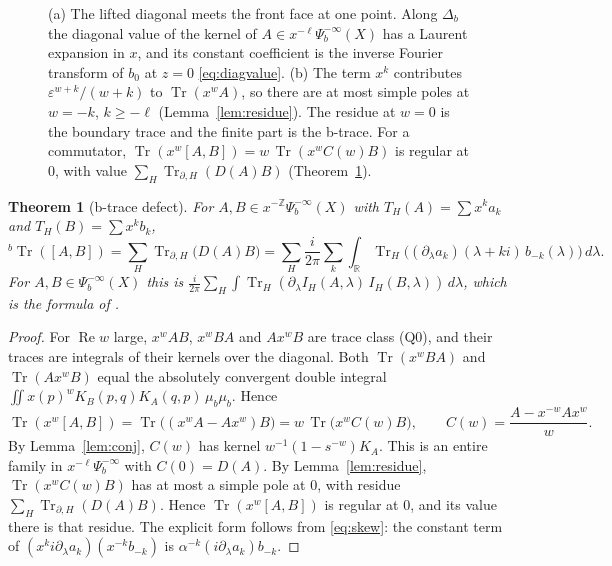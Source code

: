 \documentclass[11pt,oneside,reqno]{article}
\newcommand{\Z}{\mathbb Z}
\DeclareMathOperator{\Tr}{Tr}
\theoremstyle{plain}
\newtheorem{theorem}{Theorem}[section]
\theoremstyle{definition}
\theoremstyle{remark}
\begin{document}
\begin{figure}[tbp]
\caption[The diagonal residue and the b-trace]{(a) The lifted diagonal
meets the front face at one point. Along \(\Delta_b\) the diagonal value
of the kernel of \(A\in x^{-\ell}\Psi_b^{-\infty}(X)\) has a Laurent
expansion in \(x\), and its constant coefficient is the inverse Fourier
transform of \(b_0\) at \(z=0\) \eqref{eq:diagvalue}. (b) The term \(x^k\)
contributes \(\varepsilon^{w+k}/(w+k)\) to \(\Tr(x^wA)\), so there are at
most simple poles at \(w=-k\), \(k\geq-\ell\) (Lemma~\ref{lem:residue}).
The residue at \(w=0\) is the boundary trace and the finite part is the
b-trace. For a commutator, \(\Tr(x^w[A,B])=w\,\Tr(x^wC(w)B)\) is regular
at \(0\), with value \(\sum_H\Tr_{\partial,H}(D(A)B)\)
(Theorem~\ref{thm:defect}).}
\label{fig:btrace}
\end{figure}

\begin{theorem}[b-trace defect]\label{thm:defect}
For \(A,B\in x^{-\Z}\Psi_b^{-\infty}(X)\) with \(T_H(A)=\sum x^ka_k\) and
\(T_H(B)=\sum x^kb_k\),
\[
 {}^b\Tr([A,B])=\sum_H\Tr_{\partial,H}\bigl(D(A)B\bigr)
 =\sum_H\frac{i}{2\pi}\sum_k\int_{\mathbb R}
 \Tr_H\bigl((\partial_\lambda a_k)(\lambda+ki)\,b_{-k}(\lambda)\bigr)\,
 d\lambda .
\]
For \(A,B\in\Psi_b^{-\infty}(X)\) this is
\(\frac{i}{2\pi}\sum_H\int\Tr_H(\partial_\lambda I_H(A,\lambda)\,
I_H(B,\lambda))\,d\lambda\), which is the formula of
\cite[Thm.~``b-trace defect formula'']{Notes}.
\end{theorem}

\begin{proof}
For \(\operatorname{Re}w\) large, \(x^wAB\), \(x^wBA\) and \(Ax^wB\) are
trace class (Q0), and their traces are integrals of their kernels over the
diagonal. Both \(\Tr(x^wBA)\) and \(\Tr(Ax^wB)\) equal the absolutely
convergent double integral \(\iint x(p)^wK_B(p,q)K_A(q,p)\,\mu_b\mu_b\). Hence
\[
 \Tr(x^w[A,B])=\Tr\bigl((x^wA-Ax^w)B\bigr)=w\,\Tr\bigl(x^wC(w)B\bigr),
 \qquad C(w)=\frac{A-x^{-w}Ax^{w}}{w}.
\]
By Lemma~\ref{lem:conj}, \(C(w)\) has kernel \(w^{-1}(1-s^{-w})K_A\). This
is an entire family in \(x^{-\ell}\Psi_b^{-\infty}\) with \(C(0)=D(A)\).
By Lemma~\ref{lem:residue}, \(\Tr(x^wC(w)B)\) has at most a simple pole at
\(0\), with residue \(\sum_H\Tr_{\partial,H}(D(A)B)\). Hence
\(\Tr(x^w[A,B])\) is regular at \(0\), and its value there is that residue.
The explicit form follows from \eqref{eq:skew}: the constant term of
\((x^ki\partial_\lambda a_k)(x^{-k}b_{-k})\) is
\(\alpha^{-k}(i\partial_\lambda a_k)b_{-k}\).
\end{proof}
\end{document}
